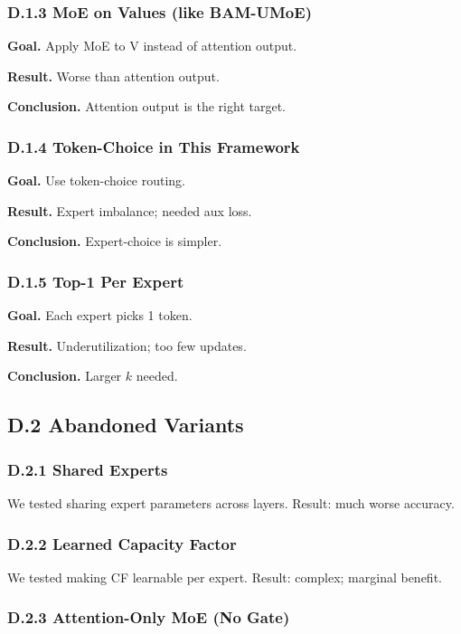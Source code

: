 \subsubsection{D.1.3 MoE on Values (like BAM-UMoE)}

\textbf{Goal.} Apply MoE to V instead of attention output.

\textbf{Result.} Worse than attention output.

\textbf{Conclusion.} Attention output is the right target.

\subsubsection{D.1.4 Token-Choice in This Framework}

\textbf{Goal.} Use token-choice routing.

\textbf{Result.} Expert imbalance; needed aux loss.

\textbf{Conclusion.} Expert-choice is simpler.

\subsubsection{D.1.5 Top-1 Per Expert}

\textbf{Goal.} Each expert picks 1 token.

\textbf{Result.} Underutilization; too few updates.

\textbf{Conclusion.} Larger $k$ needed.

\subsection{D.2 Abandoned Variants}

\subsubsection{D.2.1 Shared Experts}

We tested sharing expert parameters across layers. Result: much worse 
accuracy.

\subsubsection{D.2.2 Learned Capacity Factor}

We tested making CF learnable per expert. Result: complex; marginal 
benefit.

\subsubsection{D.2.3 Attention-Only MoE (No Gate)}

